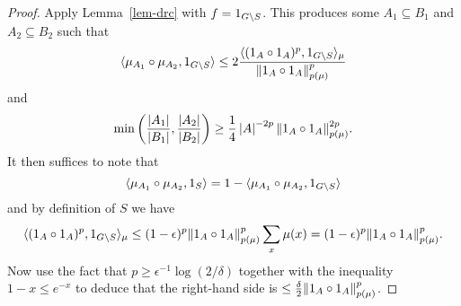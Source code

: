 \begin{proof}
\leanok
Apply Lemma~\ref{lem-drc} with $f=1_{G\backslash S}$. This produces some $A_1\subseteq B_1$ and $A_2\subseteq B_2$ such that
\[\langle \mu_{A_1}\circ \mu_{A_2}, 1_{G\backslash S}\rangle\leq 2\frac{\langle (1_{A}\circ 1_{A})^p,1_{G\backslash S}\rangle_\mu}{\lVert 1_{A}\circ 1_{A}\rVert_{p(\mu)}^p}\]
and
\[\min\left( \frac{\left\lvert A_1\right\rvert}{\left\lvert B_1\right\rvert},\frac{\left\lvert A_2\right\rvert}{\left\lvert B_2\right\rvert}\right)\geq \frac{1}{4}\left\lvert A\right\rvert^{-2p}\lVert 1_{A}\circ 1_{A}\rVert_{p(\mu)}^{2p}.\]
It then suffices to note that
\[\langle \mu_{A_1}\circ \mu_{A_2},1_{S}\rangle=1-\langle \mu_{A_1}\circ \mu_{A_2},1_{G\backslash S}\rangle\]
and by definition of $S$ we have
\[\langle (1_{A}\circ 1_{A})^p,1_{G\backslash S}\rangle_\mu\leq (1-\epsilon)^p\lVert 1_{A}\circ 1_{A}\rVert_{p(\mu)}^p\sum_{x}\mu(x)=(1-\epsilon)^p\lVert 1_{A}\circ 1_{A}\rVert_{p(\mu)}^p.\]
Now use the fact that $p\geq \epsilon^{-1}\log(2/\delta)$ together with the inequality $1-x\leq e^{-x}$ to deduce that the right-hand side is $\leq \tfrac{\delta}{2}\lVert 1_{A}\circ 1_{A}\rVert_{p(\mu)}^p$.
\end{proof}


